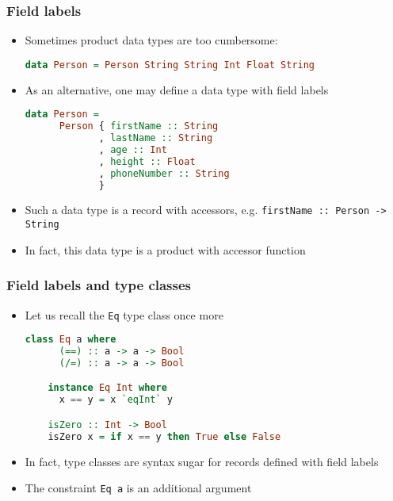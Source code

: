 \documentclass[10pt,pdf,utf8,russian,aspectratio=169]{beamer}
\begin{document}
\begin{frame}[fragile]
  \frametitle{Field labels}

  \begin{itemize}
    \item Sometimes product data types are too cumbersome:
    \begin{lstlisting}[language=Haskell]
    data Person = Person String String Int Float String
    \end{lstlisting}
    \item As an alternative, one may define a data type with field labels
    \begin{lstlisting}[language=Haskell]
    data Person =
      Person { firstName :: String
             , lastName :: String
             , age :: Int
             , height :: Float
             , phoneNumber :: String
             }
     \end{lstlisting}
     \item Such a data type is a record with accessors, e.g.
     \verb"firstName :: Person -> String"
     \item In fact, this data type is a product with accessor function
  \end{itemize}
\end{frame}

\begin{frame}[fragile]
  \frametitle{Field labels and type classes}

  \begin{itemize}
    \item Let us recall the \verb"Eq" type class once more
    \begin{lstlisting}[language=Haskell]
    class Eq a where
      (==) :: a -> a -> Bool
      (/=) :: a -> a -> Bool

    instance Eq Int where
      x == y = x `eqInt` y

    isZero :: Int -> Bool
    isZero x = if x == y then True else False
    \end{lstlisting}
    \item In fact, type classes are syntax sugar for records defined with field labels
    \item The constraint \verb"Eq a" is an additional argument
  \end{itemize}
\end{frame}
\end{document}
